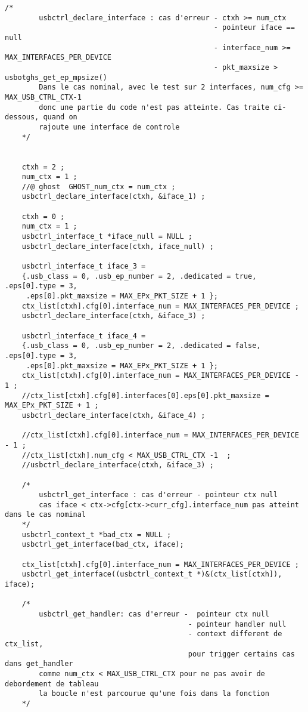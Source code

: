 \begin{lstlisting}[style=CStyle]
    /*
        usbctrl_declare_interface : cas d'erreur - ctxh >= num_ctx
                                                 - pointeur iface == null
                                                 - interface_num >= MAX_INTERFACES_PER_DEVICE
                                                 - pkt_maxsize > usbotghs_get_ep_mpsize()
        Dans le cas nominal, avec le test sur 2 interfaces, num_cfg >= MAX_USB_CTRL_CTX-1
        donc une partie du code n'est pas atteinte. Cas traite ci-dessous, quand on
        rajoute une interface de controle
    */


    ctxh = 2 ;
    num_ctx = 1 ;
    //@ ghost  GHOST_num_ctx = num_ctx ;
    usbctrl_declare_interface(ctxh, &iface_1) ;

    ctxh = 0 ;
    num_ctx = 1 ;
    usbctrl_interface_t *iface_null = NULL ;
    usbctrl_declare_interface(ctxh, iface_null) ;

    usbctrl_interface_t iface_3 =
    {.usb_class = 0, .usb_ep_number = 2, .dedicated = true, .eps[0].type = 3,
     .eps[0].pkt_maxsize = MAX_EPx_PKT_SIZE + 1 };
    ctx_list[ctxh].cfg[0].interface_num = MAX_INTERFACES_PER_DEVICE ;
    usbctrl_declare_interface(ctxh, &iface_3) ;

    usbctrl_interface_t iface_4 =
    {.usb_class = 0, .usb_ep_number = 2, .dedicated = false, .eps[0].type = 3,
     .eps[0].pkt_maxsize = MAX_EPx_PKT_SIZE + 1 };
    ctx_list[ctxh].cfg[0].interface_num = MAX_INTERFACES_PER_DEVICE - 1 ;
    //ctx_list[ctxh].cfg[0].interfaces[0].eps[0].pkt_maxsize = MAX_EPx_PKT_SIZE + 1 ;
    usbctrl_declare_interface(ctxh, &iface_4) ;

    //ctx_list[ctxh].cfg[0].interface_num = MAX_INTERFACES_PER_DEVICE - 1 ;
    //ctx_list[ctxh].num_cfg < MAX_USB_CTRL_CTX -1  ;
    //usbctrl_declare_interface(ctxh, &iface_3) ;

    /*
        usbctrl_get_interface : cas d'erreur - pointeur ctx null
        cas iface < ctx->cfg[ctx->curr_cfg].interface_num pas atteint dans le cas nominal
    */
    usbctrl_context_t *bad_ctx = NULL ;
    usbctrl_get_interface(bad_ctx, iface);

    ctx_list[ctxh].cfg[0].interface_num = MAX_INTERFACES_PER_DEVICE ;
    usbctrl_get_interface((usbctrl_context_t *)&(ctx_list[ctxh]), iface);

    /*
        usbctrl_get_handler: cas d'erreur -  pointeur ctx null
                                           - pointeur handler null
                                           - context different de ctx_list,
                                           pour trigger certains cas dans get_handler
        comme num_ctx < MAX_USB_CTRL_CTX pour ne pas avoir de debordement de tableau
        la boucle n'est parcourue qu'une fois dans la fonction
    */


\end{lstlisting}
